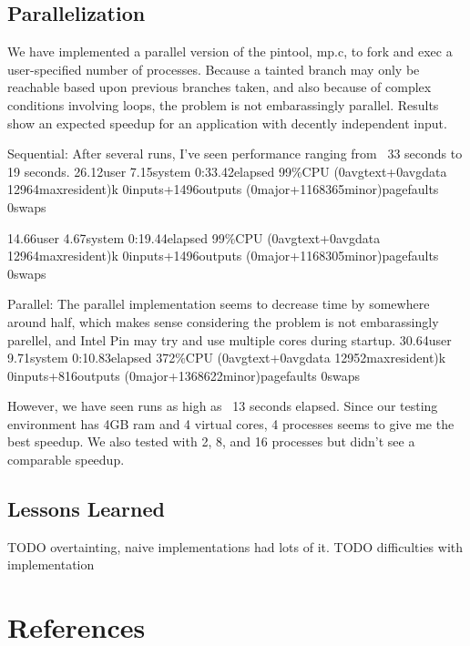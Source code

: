 \documentclass[11pt,expanded,copyright]{fsuthesis}
\begin{document}
\section{Parallelization}

We have implemented a parallel version of the pintool, mp.c, to fork and exec a user-specified number of processes. Because a tainted branch may only be reachable based upon previous branches taken, and also because of complex conditions involving loops, the problem is not embarassingly parallel. Results show an expected speedup for an application with decently independent input.

Sequential:
After several runs, I've seen performance ranging from ~33 seconds to 19 seconds.
26.12user 7.15system 0:33.42elapsed 99\%CPU (0avgtext+0avgdata 12964maxresident)k
0inputs+1496outputs (0major+1168365minor)pagefaults 0swaps

14.66user 4.67system 0:19.44elapsed 99\%CPU (0avgtext+0avgdata 12964maxresident)k
0inputs+1496outputs (0major+1168305minor)pagefaults 0swaps

Parallel:
The parallel implementation seems to decrease time by somewhere around half, which makes sense considering the problem is not embarassingly parellel, and Intel Pin may try and use multiple cores during startup.
30.64user 9.71system 0:10.83elapsed 372\%CPU (0avgtext+0avgdata 12952maxresident)k
0inputs+816outputs (0major+1368622minor)pagefaults 0swaps

However, we have seen runs as high as ~13 seconds elapsed. Since our testing environment has 4GB ram and 4 virtual cores, 4 processes seems to give me the best speedup. We also tested with 2, 8, and 16 processes but didn't see a comparable speedup.

%

\section{Lessons Learned}

TODO overtainting, naive implementations had lots of it.
TODO difficulties with implementation

\chapter{References}
\end{document}

